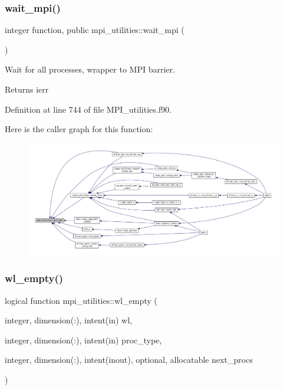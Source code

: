 \subsubsection{\texorpdfstring{wait\+\_\+mpi()}{wait\_mpi()}}
{\footnotesize\ttfamily integer function, public mpi\+\_\+utilities\+::wait\+\_\+mpi (\begin{DoxyParamCaption}{ }\end{DoxyParamCaption})}



Wait for all processes, wrapper to M\+PI barrier. 

\begin{DoxyReturn}{Returns}
ierr 
\end{DoxyReturn}


Definition at line 744 of file M\+P\+I\+\_\+utilities.\+f90.

Here is the caller graph for this function\+:\nopagebreak
\begin{figure}[H]
\begin{center}
\leavevmode
\includegraphics[width=350pt]{namespacempi__utilities_a790ea24d32dd0e249541c1e57cd85536_icgraph}
\end{center}
\end{figure}
\mbox{\label{namespacempi__utilities_a74e2e82b561f403ca8087c3925f76e29}} 
\subsubsection{\texorpdfstring{wl\+\_\+empty()}{wl\_empty()}}
{\footnotesize\ttfamily logical function mpi\+\_\+utilities\+::wl\+\_\+empty (\begin{DoxyParamCaption}\item[{integer, dimension(\+:), intent(in)}]{wl,  }\item[{integer, dimension(\+:), intent(in)}]{proc\+\_\+type,  }\item[{integer, dimension(\+:), intent(inout), optional, allocatable}]{next\+\_\+procs }\end{DoxyParamCaption})}



